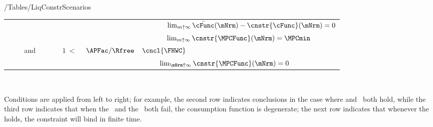 \documentclass[\econtexRoot/BufferStockTheory]{subfiles}
\begin{document}
\begin{verbatimwrite}{\econtexRoot/Tables/LiqConstrScenarios}
\begin{table}[b]
{\begin{tabular}{|l|rcl|l|}
          \\ ~~~~               &                          &                             &                          & ~~~~~~~$\lim_{m \uparrow \infty}\bar{\cFunc}(\mNrm) - \cnstr{\cFunc}(\mNrm) = 0$ %
          \\ ~~~~               &                          &                             &                          & ~~~~~~~$\lim_{m \uparrow \infty}\cnstr{\MPCFunc}(\mNrm) = \MPCmin$ %
          \\ ~~~~ and \cncl{\RIC}   &                          & $\phantom{~<~}1         ~<~ $ & $         \APFac/\Rfree$ & $\cncl{\FHWC}$
          \\ ~~~~~~             &                          &                             &                          & ~~~~~$\lim_{\mNrm \uparrow \infty} \cnstr{\MPCFunc}(\mNrm) =  0$               %
          \\ \hline
        \end{tabular}
      } %

      \settowidth\TableWidth{\usebox{\LiqConstrScenarios}}
      \usebox{\LiqConstrScenarios}
      \\ \medskip 
      \parbox{\TableWidth}{\raggedright \footnotesize Conditions are applied from left to right; for example, the second row indicates conclusions in the case where \cncl{\GICRaw} and \RIC~both hold, while the third row indicates that when the \GICRaw~and the \RIC~both fail, the consumption function is degenerate; the next row indicates that whenever the {\GICRaw} holds, the constraint will bind in finite time.}

    \end{table}


  \end{verbatimwrite}
  \clearpage
  
\end{document}
